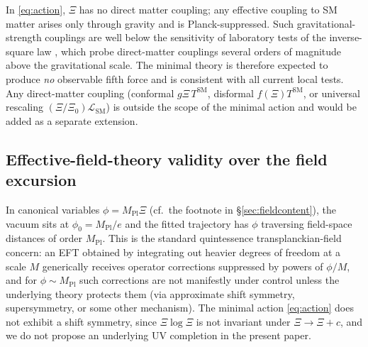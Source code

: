 \documentclass[11pt,reqno]{amsart}
\theoremstyle{plain}
\theoremstyle{definition}
\theoremstyle{remark}
\newcommand{\Pl}{\mathrm{Pl}}
\newcommand{\SM}{\mathrm{SM}}
\begin{document}
In \eqref{eq:action}, $\Xi$ has no direct matter coupling; any effective
coupling to SM matter arises only through gravity and is Planck-suppressed.
Such gravitational-strength couplings are well below the sensitivity of
laboratory tests of the inverse-square law \cite{EotWash,MICROSCOPE},
which probe direct-matter couplings several orders of magnitude above
the gravitational scale. The minimal theory is therefore expected to
produce \emph{no} observable fifth force and is consistent with all
current local tests. Any direct-matter coupling (conformal
$g\Xi\, T^{\SM}$, disformal $f(\Xi) T^{\SM}$, or universal rescaling
$(\Xi/\Xi_0) \mathcal{L}_{\SM}$) is outside the scope of the minimal
action and would be added as a separate extension.

\subsection{Effective-field-theory validity over the field
excursion}\label{sec:eft}

In canonical variables $\phi = M_\Pl \Xi$ (cf.\ the footnote in
\S\ref{sec:fieldcontent}), the vacuum sits at $\phi_0 = M_\Pl/e$ and
the fitted trajectory has $\phi$ traversing field-space distances of
order $M_\Pl$. This is the standard quintessence transplanckian-field
concern: an EFT obtained by integrating out heavier degrees of freedom
at a scale $M$ generically receives operator corrections suppressed by
powers of $\phi/M$, and for $\phi \sim M_\Pl$ such corrections are not
manifestly under control unless the underlying theory protects them
(via approximate shift symmetry, supersymmetry, or some other
mechanism). The minimal action \eqref{eq:action} does not exhibit a
shift symmetry, since $\Xi\log\Xi$ is not invariant under
$\Xi \to \Xi + c$, and we do not propose an underlying UV completion in
the present paper.
\end{document}
